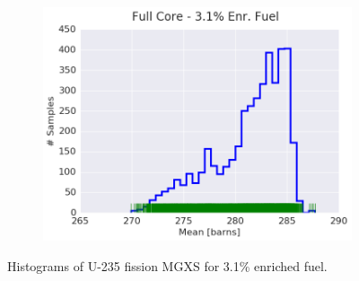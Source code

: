 \begin{figure}[h!]
\begin{subfigure}{0.5\textwidth}
  \includegraphics[width=\linewidth]{figures/patterns/full-core/hist-kde-rug/31-enr-fiss-2} \caption{}
  \label{fig:chap9-hist-full-core-3.1-fiss}
\end{subfigure}
\caption[Histogram of U-235 fission MGXS 3.1\% enriched fuel]{Histograms of U-235 fission \ac{MGXS} for 3.1\% enriched fuel.}
\label{fig:chap9-hist-3.1-fiss}
\end{figure}



